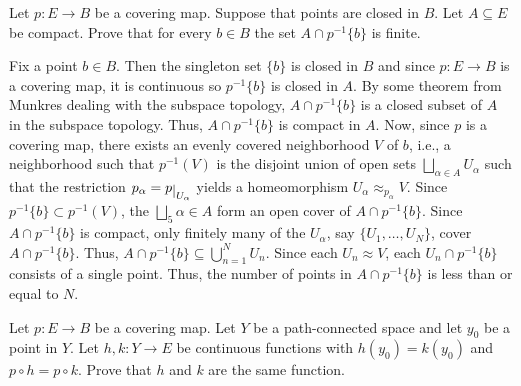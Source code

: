 \begin{problem}
  Let \(p\colon E\to B\) be a covering map. Suppose that points are closed
  in \(B\). Let \(A\subseteq E\) be compact. Prove that for every
  \(b\in B\) the set \(A\cap p^{-1}\{b\}\) is finite.
\end{problem}
\begin{solution}
  Fix a point \(b\in B\). Then the singleton set \(\{b\}\) is closed in
  \(B\) and since \(p\colon E\to B\) is a covering map, it is continuous so
  \(p^{-1}\{b\}\) is closed in \(A\). By some theorem from Munkres dealing
  with the subspace topology, \(A\cap p^{-1}\{b\}\) is a closed subset of
  \(A\) in the subspace topology. Thus, \(A\cap p^{-1}\{b\}\) is compact in
  \(A\). Now, since \(p\) is a covering map, there exists an evenly covered
  neighborhood \(V\) of \(b\), i.e., a neighborhood such that \(p^{-1}(V)\)
  is the disjoint union of open sets \(\bigsqcup_{\alpha\in A} U_\alpha\)
  such that the restriction \(p_\alpha=p\restrict{U_\alpha}\) yields a
  homeomorphism \(U_\alpha\approx_{p_\alpha} V\). Since
  \(p^{-1}\{b\}\subset p^{-1}(V)\), the \(\bigsqcup_5\alpha\in A\) form an
  open cover of \(A\cap p^{-1}\{b\}\). Since \(A\cap p^{-1}\{b\}\) is
  compact, only finitely many of the \(U_\alpha\), say
  \(\{U_1,\dotsc,U_N\}\), cover \(A\cap p^{-1}\{b\}\). Thus,
  \(A\cap p^{-1}\{b\}\subseteq\bigcup_{n=1}^N U_n\). Since each
  \(U_n\approx V\), each \(U_n\cap p^{-1}\{b\}\) consists of a single
  point. Thus, the number of points in \(A\cap p^{-1}\{b\}\) is less than
  or equal to \(N\).
\end{solution}

\begin{problem}
  Let \(p\colon E\to B\) be a covering map. Let \(Y\) be a path-connected
  space and let \(y_0\) be a point in \(Y\). Let \(h,k\colon Y\to E\) be
  continuous functions with \(h(y_0)=k(y_0)\) and \(p\circ h=p\circ
  k\). Prove that \(h\) and \(k\) are the same function.
\end{problem}
\begin{solution}
\end{solution}

